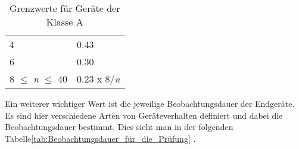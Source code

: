 \begin{appendix}
\begin{table}[ht!]
\begin{tabular}{|l|l|}
		4                                            & 0.43                                                                                                                \\
		6                                            & 0.30                                                                                                                \\
		8 $\leq$ \textit{n} $\leq$ 40                & 0.23 x 8/\textit{n}                                                                                                 \\ \hline
	\end{tabular}
	\caption{Grenzwerte für Geräte der Klasse A}\label{tab:Grenzwerte_Normen}
\end{table}


Ein weiterer wichtiger Wert ist die jeweilige Beobachtungsdauer der Endgeräte. Es sind hier verschiedene Arten von Geräteverhalten definiert und dabei die Beobachtungsdauer bestimmt. Dies sieht man in der folgenden Tabelle\ref{tab:Beobachtungsdauer_für_die_Prüfung} \cite{EMVNorm}.


\end{appendix}
